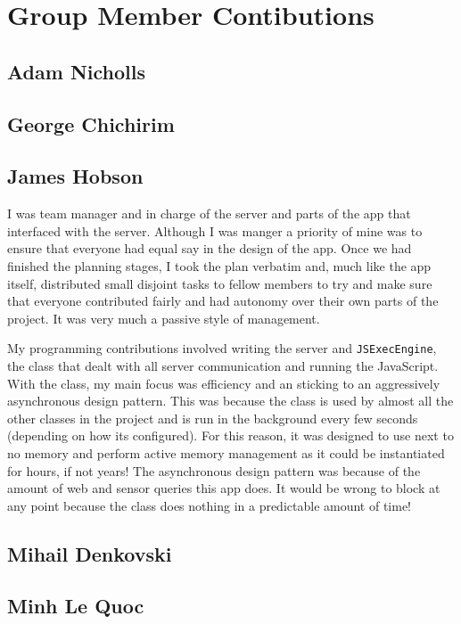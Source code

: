 \documentclass{article}
\begin{document}
\section{Group Member Contibutions}
\subsection{Adam Nicholls}
\subsection{George Chichirim}
\subsection{James Hobson}
I was team manager and in charge of the server and parts of the app that interfaced with the server. Although I was manger a priority of mine
was to ensure that everyone had equal say in the design of the app. Once we had finished the planning stages, I took the plan verbatim and,
much like the app itself, distributed small disjoint tasks to fellow members to try and make sure that everyone contributed fairly
and had autonomy over their own parts of the project. It was very much a passive style of management.

My programming contributions involved writing the server and \texttt{JSExecEngine}, the class that dealt with all server communication and
running the JavaScript. With the class, my main focus was efficiency and an sticking to an aggressively asynchronous design pattern. This was
because the class is used by almost all the other classes in the project and is run in the background every few seconds (depending on how its configured).
For this reason, it was designed to use next to no memory and perform active memory management as it could be instantiated for hours, if not years!
The asynchronous design pattern was because of the amount of web and sensor queries this app does. It would be wrong to block at any point because
the class does nothing in a predictable amount of time!
\subsection{Mihail Denkovski}
\subsection{Minh Le Quoc}
\end{document}
